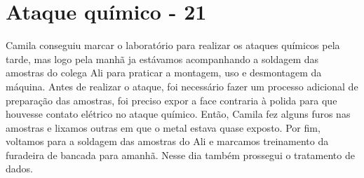 \section{Ataque químico - 21}
Camila conseguiu marcar o laboratório para realizar os ataques químicos pela tarde, mas logo pela manhã ja estávamos acompanhando a soldagem das amostras do colega Ali para praticar a montagem, uso e desmontagem da máquina. Antes de realizar o ataque, foi necessário fazer um processo adicional de preparação das amostras, foi preciso expor a face contraria à polida para que houvesse contato elétrico no ataque químico. Então, Camila fez alguns furos nas amostras e lixamos outras em que o metal estava quase exposto. Por fim, voltamos para a soldagem das amostras do Ali e marcamos treinamento da furadeira de bancada para amanhã. Nesse dia também prossegui o tratamento de dados.



